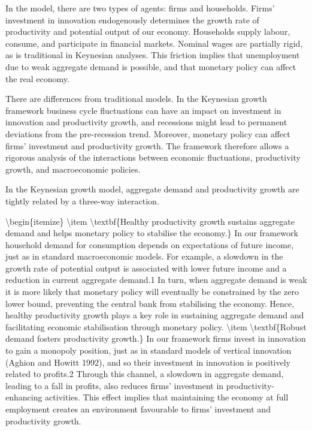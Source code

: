 \documentclass[10pt,math=newtx,citestyle=gb7714-2015,bibstyle=gb7714-2015]{elegantbook}
\begin{document}
	In the model, there are two types of agents: firms and households. Firms' investment in innovation endogenously determines the growth rate of productivity and potential output of our economy. Households supply labour, consume, and participate in financial markets. Nominal wages are partially rigid, as is traditional in Keynesian analyses. This friction implies that unemployment due to weak aggregate demand is possible, and that monetary policy can affect the real economy.
	
	There are differences from traditional models. In the Keynesian growth framework business cycle fluctuations can have an impact on investment in innovation and productivity growth, and recessions might lead to permanent deviations from the pre-recession trend. Moreover, monetary policy can affect firms’ investment and productivity growth. The framework therefore allows a rigorous analysis of the interactions between economic fluctuations, productivity growth, and macroeconomic policies.
	
	In the Keynesian growth model, aggregate demand and productivity growth are tightly related by a three-way interaction.
	
	\textbackslash{}begin\{itemize\}
	\textbackslash{}item \textbackslash{}textbf\{Healthy productivity growth sustains aggregate demand and helps monetary policy to stabilise the economy.\} In our framework household demand for consumption depends on expectations of future income, just as in standard macroeconomic models. For example, a slowdown in the growth rate of potential output is associated with lower future income and a reduction in current aggregate demand.1 In turn, when aggregate demand is weak it is more likely that monetary policy will eventually be constrained by the zero lower bound, preventing the central bank from stabilising the economy. Hence, healthy productivity growth plays a key role in sustaining aggregate demand and facilitating economic stabilisation through monetary policy.
	\textbackslash{}item \textbackslash{}textbf\{Robust demand fosters productivity growth.\} In our framework firms invest in innovation to gain a monopoly position, just as in standard models of vertical innovation (Aghion and Howitt 1992), and so their investment in innovation is positively related to profits.2 Through this channel, a slowdown in aggregate demand, leading to a fall in profits, also reduces firms’ investment in productivity-enhancing activities. This effect implies that maintaining the economy at full employment creates an environment favourable to firms’ investment and productivity growth. 
	
\end{document}
